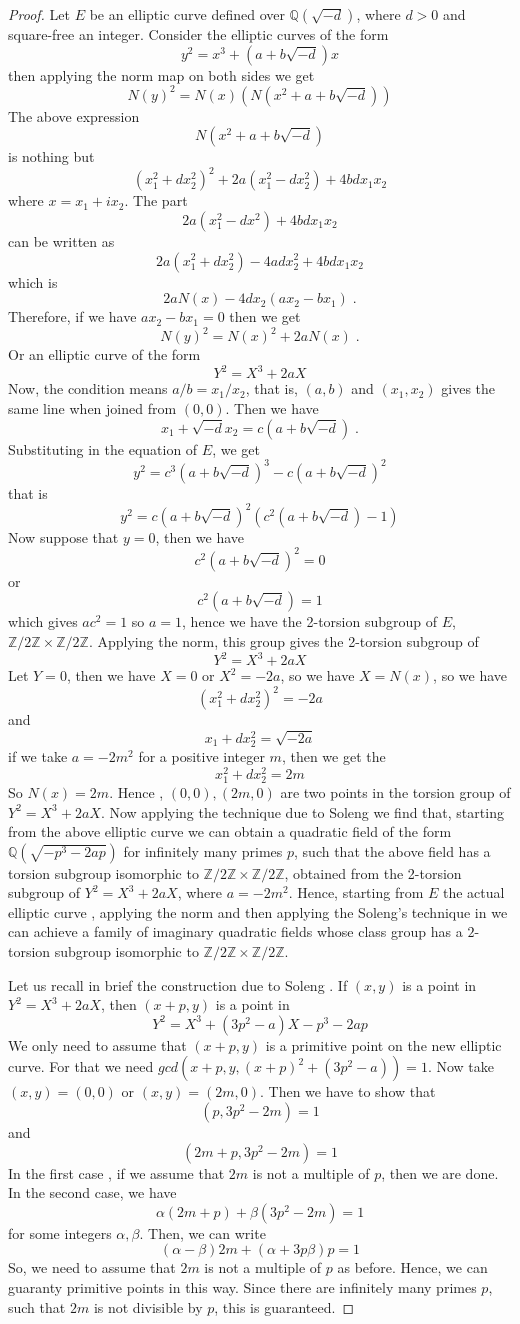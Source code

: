 \documentclass[12pt,leqno]{amsart}
\newcommand{\<}{\langle}
\renewcommand{\>}{\rangle}
\theoremstyle{definition}
\numberwithin{equation}{section}
\begin{document}
\begin{proof}

Let $E$ be an elliptic curve defined over $\mathbb Q(\sqrt{-d})$, where $d>0$ and square-free an integer. Consider the elliptic curves of the form 
$$y^2=x^3+(a+b\sqrt{-d})x$$
then applying the norm map on both sides we get
$$N(y)^2=N(x)(N(x^2+a+b\sqrt{-d}))$$
The above expression 
$$N(x^2+a+b\sqrt{-d})$$
is nothing but
$$(x_1^2+dx_2^2)^2+2a(x_1^2-dx_2^2)+4bdx_1x_2$$
where $x=x_1+ix_2$.
The part 
$$2a(x_1^2-dx^2)+4bdx_1x_2$$
can be written as
$$2a(x_1^2+dx_2^2)-4adx_2^2+4bdx_1x_2$$
which is 
$$2aN(x)-4dx_2(ax_2-bx_1)\;.$$
Therefore, if we have 
$ax_2-bx_1=0$ then we get
$$N(y)^2=N(x)^2+2aN(x)\;.$$
Or an elliptic curve of the form
$$Y^2=X^3+2aX$$
Now, the condition means $a/b=x_1/x_2$, that is, $(a,b)$ and $(x_1,x_2)$ gives the same line when joined from $(0,0)$. Then we have $$x_1+\sqrt{-d}x_2=c(a+b\sqrt{-d})\;.$$ Substituting in the equation of $E$, we get 
$$y^2=c^3(a+b\sqrt{-d})^3-c(a+b\sqrt{-d})^2$$
that is
$$y^2=c(a+b\sqrt{-d})^2(c^2(a+b\sqrt{-d})-1)$$
Now suppose that $y=0$, then we have 
$$c^2(a+b\sqrt{-d})^2=0$$
or $$c^2(a+b\sqrt{-d})=1$$
which gives $ac^2=1$
so $a=1$, hence we have the 2-torsion subgroup of $E$, $\mathbb Z/2\mathbb Z\times \mathbb Z/2\mathbb Z$. Applying the norm, this group gives the 2-torsion subgroup of 
$$Y^2=X^3+2aX$$
Let $Y=0$, then we have $X=0$ or $X^2=-2a$, so we have $X=N(x)$, so we have 
$$(x_1^2+dx_2^2)^2=-2a$$
and $$x_1+dx_2^2=\sqrt{-2a}$$
if we take $a=-2m^2$ for a positive integer $m$, then we get the
$$x_1^2+dx_2^2=2m$$
So $N(x)=2m$. Hence , $(0,0), (2m,0)$ are two points in the torsion group of $Y^2=X^3+2aX$. Now applying the technique due to Soleng \cite{S} we find that, starting from the above elliptic curve we can obtain a quadratic field of the form $\mathbb Q(\sqrt{-p^3-2ap})$ for infinitely many primes $p$, such that the above field has a torsion subgroup isomorphic to $\mathbb Z/2\mathbb Z\times \mathbb Z/2\mathbb Z$, obtained from the 2-torsion subgroup of $Y^2=X^3+2aX$, where $a=-2m^2$. Hence, starting from $E$ the actual elliptic curve , applying the norm and then applying the Soleng's technique in \cite{S} we can achieve a family of imaginary quadratic fields whose class group has a $2$-torsion subgroup isomorphic to $\mathbb Z/2\mathbb Z\times \mathbb Z/2\mathbb Z$.

Let us recall in brief the construction due to Soleng \cite{S}. If $(x,y)$ is a point in $Y^2=X^3+2aX$, then $(x+p,y)$ is a point in
$$Y^2=X^3+(3p^2-a)X-p^3-2ap$$
We only need to assume that $(x+p,y)$ is a primitive point on the new elliptic curve. For that we need 
$gcd(x+p, y, (x+p)^2+(3p^2-a))=1$. Now take $(x,y)=(0,0)$ or $(x,y)=(2m,0)$. Then we have to show that 
$$(p,3p^2-2m)=1$$
and 
$$(2m+p, 3p^2-2m)=1$$
In the first case , if we assume that $2m$ is not a multiple of $p$, then we are done. In the second case, we have 
$$\alpha(2m+p)+\beta(3p^2-2m)=1$$
for some integers $\alpha, \beta$.
Then, we can write
$$(\alpha-\beta)2m+(\alpha+3p\beta)p=1$$
So, we need to assume that $2m$ is not a multiple of $p$ as before. Hence, we can guaranty primitive points in this way. Since there are infinitely many primes $p$, such that $2m$ is not divisible by $p$, this is guaranteed.
\end{proof}
\end{document}
